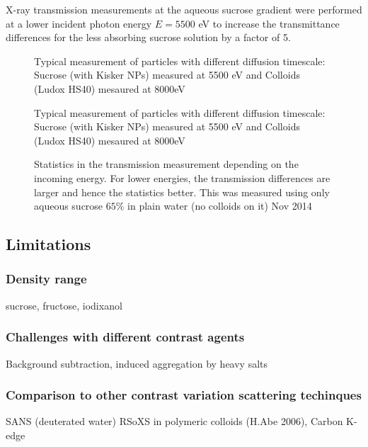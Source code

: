 X-ray transmission measurements at the aqueous sucrose gradient were performed at a lower incident photon energy $E = 5500$ eV to increase the transmittance differences for the less absorbing sucrose solution by a factor of 5.

\begin{figure}%
	\centering
		
		\caption{Typical measurement of particles with different diffusion timescale: Sucrose (with Kisker NPs) measured at 5500 eV and Colloids (Ludox HS40) mesaured at 8000eV}
		\label{fig:LudoxHS40TransmissionCalibration}
\end{figure}

\begin{figure}%
	\centering
		
		\caption{Typical measurement of particles with different diffusion timescale: Sucrose (with Kisker NPs) measured at 5500 eV and Colloids (Ludox HS40) mesaured at 8000eV}
		\label{fig:KiskerTransmissionCalibration}
\end{figure}

\begin{figure}%
	\centering
	\caption{Statistics in the transmission measurement depending on the incoming energy. For lower energies, the transmission differences are larger and hence the statistics better. This was measured using only aqueous sucrose $65\%$ in plain water (no colloids on it) Nov 2014}
\end{figure}


\subsection{Limitations}
\subsubsection{Density range}
sucrose, fructose, iodixanol
\subsubsection{Challenges with different contrast agents}
Background subtraction, induced aggregation by heavy salts
\subsubsection{Comparison to other contrast variation scattering techinques}
SANS (deuterated water)
RSoXS in polymeric colloids (H.Abe 2006), Carbon K-edge


